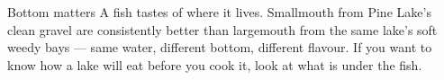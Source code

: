 \begin{telospanel}{Bottom matters}
A fish tastes of where it lives. Smallmouth from Pine Lake's clean gravel are consistently better than largemouth from the same lake's soft weedy bays --- same water, different bottom, different flavour. If you want to know how a lake will eat before you cook it, look at what is under the fish. 
\end{telospanel}




